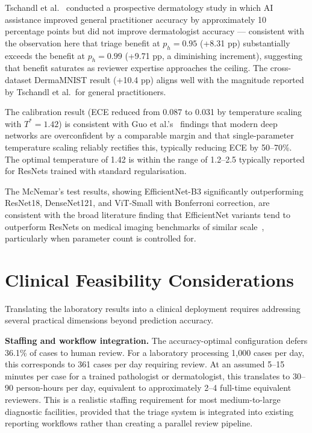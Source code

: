 Tschandl et al.~\cite{tschandl2020human} conducted a prospective dermatology study in which AI assistance improved general practitioner accuracy by approximately 10 percentage points but did not improve dermatologist accuracy --- consistent with the observation here that triage benefit at $p_h = 0.95$ (+8.31 pp) substantially exceeds the benefit at $p_h = 0.99$ (+9.71 pp, a diminishing increment), suggesting that benefit saturates as reviewer expertise approaches the ceiling. The cross-dataset DermaMNIST result (+10.4 pp) aligns well with the magnitude reported by Tschandl et al.\ for general practitioners.

The calibration result (ECE reduced from 0.087 to 0.031 by temperature scaling with $T^* = 1.42$) is consistent with Guo et al.'s~\cite{guo2017calibration} findings that modern deep networks are overconfident by a comparable margin and that single-parameter temperature scaling reliably rectifies this, typically reducing ECE by 50--70\%. The optimal temperature of 1.42 is within the range of 1.2--2.5 typically reported for ResNets trained with standard regularisation.

The McNemar's test results, showing EfficientNet-B3 significantly outperforming ResNet18, DenseNet121, and ViT-Small with Bonferroni correction, are consistent with the broad literature finding that EfficientNet variants tend to outperform ResNets on medical imaging benchmarks of similar scale~\cite{tan2019efficientnet}, particularly when parameter count is controlled for.

\section{Clinical Feasibility Considerations}

Translating the laboratory results into a clinical deployment requires addressing several practical dimensions beyond prediction accuracy.

\textbf{Staffing and workflow integration.} The accuracy-optimal configuration defers 36.1\% of cases to human review. For a laboratory processing 1,000 cases per day, this corresponds to 361 cases per day requiring review. At an assumed 5--15 minutes per case for a trained pathologist or dermatologist, this translates to 30--90 person-hours per day, equivalent to approximately 2--4 full-time equivalent reviewers. This is a realistic staffing requirement for most medium-to-large diagnostic facilities, provided that the triage system is integrated into existing reporting workflows rather than creating a parallel review pipeline.

